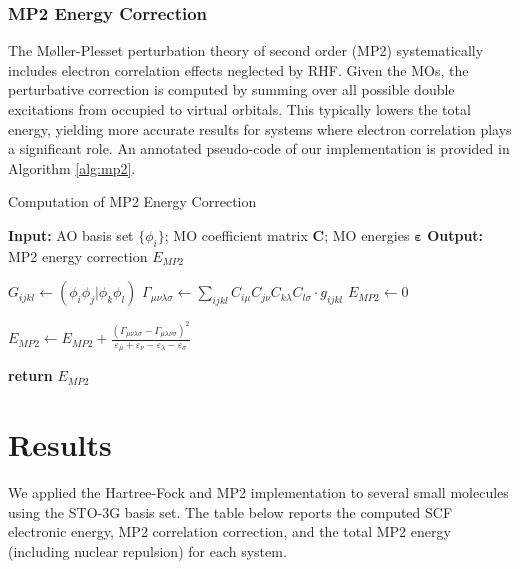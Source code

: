 \documentclass[12pt]{article}
\begin{document}
\subsubsection*{MP2 Energy Correction}

The Møller-Plesset perturbation theory of second order (MP2) systematically includes electron correlation effects neglected by RHF. Given the MOs, the perturbative correction is computed by summing over all possible double excitations from occupied to virtual orbitals. This typically lowers the total energy, yielding more accurate results for systems where electron correlation plays a significant role. An annotated pseudo-code of our implementation is provided in Algorithm \ref{alg:mp2}. 

\begin{algorithm}[H]
    \caption{Computation of MP2 Energy Correction}
    \begin{algorithmic}[1]
        \Statex \textbf{Input:} AO basis set $\{\phi_i\}$; MO coefficient matrix $\mathbf{C}$; MO energies $\boldsymbol{\varepsilon}$
        \Statex \textbf{Output:} MP2 energy correction $E_{MP2}$

        \State $G_{ijkl} \gets (\phi_i \phi_j | \phi_k \phi_l)$ 
        \State $\Gamma_{\mu \nu \lambda \sigma} \gets \sum_{ijkl} C_{i \mu} C_{j \nu} C_{k \lambda} C_{l \sigma} \cdot g_{ijkl}$ 
        \State $E_{MP2} \gets 0$ 

                \State $E_{MP2} \gets E_{MP2} + \frac{(\Gamma_{\mu \nu \lambda \sigma} - \Gamma_{\mu \lambda \nu \sigma})^2}{\varepsilon_\mu + \varepsilon_\nu - \varepsilon_\lambda - \varepsilon_\sigma}$ 
            \EndFor
        \EndFor

        \State \textbf{return} $E_{MP2}$
    \end{algorithmic}
    \label{alg:mp2}
\end{algorithm}

\section{Results}

We applied the Hartree-Fock and MP2 implementation to several small molecules using the STO-3G basis set. The table below reports the computed SCF electronic energy, MP2 correlation correction, and the total MP2 energy (including nuclear repulsion) for each system.
\end{document}

